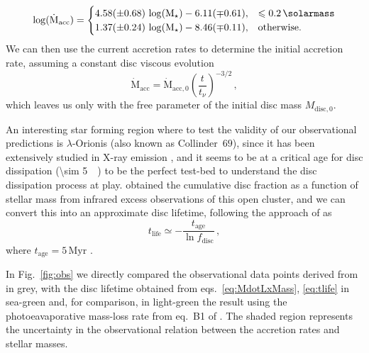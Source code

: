 \documentclass[usenatbib,useAMS,usedcolumn]{mnras}
\begin{document}
\begin{equation}\label{eq:mdotAlcala}
    \log(\dot{\mathrm{M}}_\mathrm{acc}) = 
    \begin{cases}
      4.58 (\pm 0.68) \, \log(\mathrm{M}_\star) - 6.11(\mp 0.61), & \leq \SI{0.2}{\solarmass} \\
      1.37 (\pm 0.24) \, \log(\mathrm{M}_\star) - 8.46 (\mp 0.11), & \text{otherwise.}
    \end{cases}
\end{equation}
We can then use the current accretion rates to determine the initial accretion rate, assuming a constant disc viscous evolution
\begin{equation}\label{eq:mdot0}
    \dot{\mathrm{M}}_\mathrm{acc} = \dot{\mathrm{M}}_\mathrm{acc,0} \left(\frac{t}{t_\nu}\right)^{-3/2}\,,
\end{equation}
which leaves us only with the free parameter of the initial disc mass $M_\mathrm{disc,0}$.

An interesting star forming region where to test the validity of our observational predictions is $\lambda$-Orionis (also known as Collinder~$69$), since it has been extensively studied in X-ray emission , and it seems to be at a critical age for disc dissipation (\SI{\sim 5}{\mega\year}) to be the perfect test-bed to understand the disc dissipation process at play.
 obtained the cumulative disc fraction as a function of stellar mass from infrared excess observations of this open cluster, and we can convert this into an approximate disc lifetime, following the approach of  as
\begin{equation}
    t_\mathrm{life} \simeq -\frac{t_\mathrm{age}}{\ln{f_\mathrm{disc}}}\, ,
\end{equation}
where $t_\mathrm{age} = 5\, \mathrm{Myr}$ .

In Fig.~\ref{fig:obs} we directly compared the observational data points derived from  in grey, with the disc lifetime obtained from eqs.~\ref{eq:MdotLxMass}, \ref{eq:tlife} in sea-green and, for comparison, in light-green the result using the photoeavaporative mass-loss rate from eq.~B1 of . The shaded region represents the uncertainty in the observational relation between the accretion rates and stellar masses.
\end{document}
